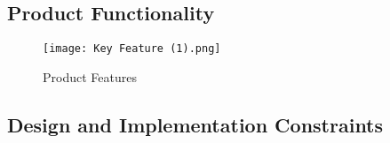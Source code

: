 \documentclass[a4paper,12pt]{article}
\begin{document}
\clearpage
\subsection{Product Functionality} \label{subsec:functionality}


\begin{figure}[h] %
    \centering
    \texttt{[image: Key Feature (1).png]} %
    \caption{Product Features}
    \label{fig:Product Features} %
\end{figure}

\subsection{Design and Implementation Constraints} \\\label{subsec:constraints}
\end{document}
